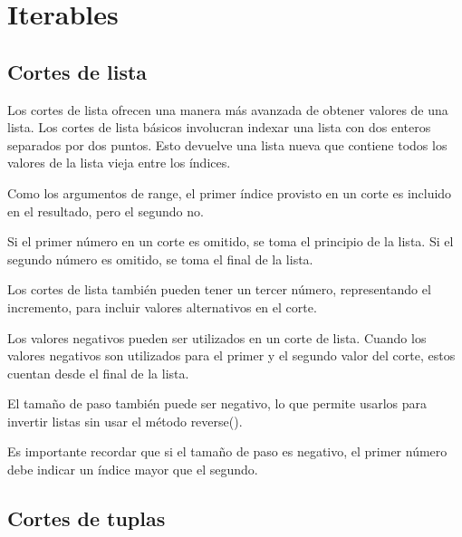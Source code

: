 \documentclass{report}
\begin{document}
\clearpage\chapter{Iterables}


\section{Cortes de lista}

Los cortes de lista ofrecen una manera más avanzada de obtener valores de una lista. Los cortes de lista básicos involucran indexar una lista con dos enteros separados por dos puntos. Esto devuelve una lista nueva que contiene todos los valores de la lista vieja entre los índices.


Como los argumentos de range, el primer índice provisto en un corte es incluido en el resultado, pero el segundo no.\smallskip

Si el primer número en un corte es omitido, se toma el principio de la lista. Si el segundo número es omitido, se toma el final de la lista.


Los cortes de lista también pueden tener un tercer número, representando el incremento, para incluir valores alternativos en el corte.


Los valores negativos pueden ser utilizados en un corte de lista. Cuando los valores negativos son utilizados para el primer y el segundo valor del corte, estos cuentan desde el final de la lista.


El tamaño de paso también puede ser negativo, lo que permite usarlos para invertir listas sin usar el método reverse().


Es importante recordar que si el tamaño de paso es negativo, el primer número debe indicar un índice mayor que el segundo.

\section{Cortes de tuplas}
\end{document}
